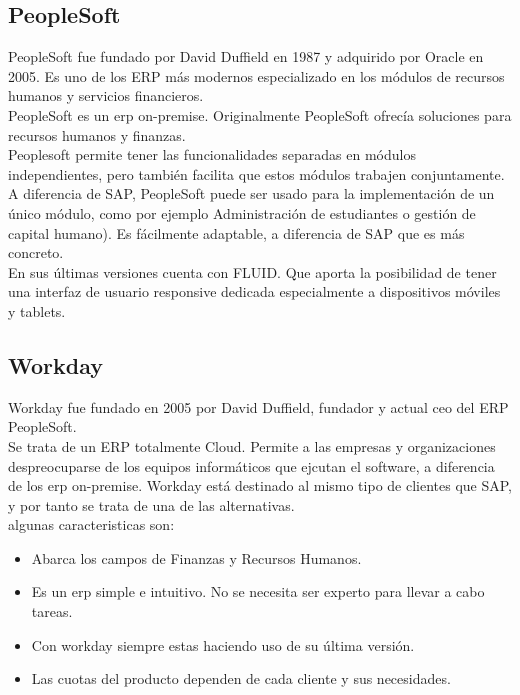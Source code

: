 \subsection{PeopleSoft}
PeopleSoft fue fundado por David Duffield en 1987 y adquirido por Oracle en 2005. Es uno de los ERP más modernos especializado en los módulos de recursos humanos y servicios financieros.\\

PeopleSoft es un \acrshort{erp} \gls{on-premise}.
Originalmente PeopleSoft ofrecía soluciones para recursos humanos y finanzas.\\

Peoplesoft permite tener las funcionalidades separadas en módulos independientes, pero también facilita que estos módulos trabajen conjuntamente.
A diferencia de SAP, PeopleSoft puede ser usado para la implementación de un único módulo, como por ejemplo Administración de estudiantes o gestión de capital humano).
Es fácilmente adaptable, a diferencia de SAP que es más concreto.\\

En sus últimas versiones cuenta con FLUID. Que aporta la posibilidad de tener una interfaz de usuario responsive dedicada especialmente a dispositivos móviles y tablets.



\subsection{Workday}
Workday fue fundado en 2005 por David Duffield, fundador y actual \acrshort{ceo} del ERP PeopleSoft.\\



Se trata de un ERP totalmente Cloud. Permite a las empresas y organizaciones despreocuparse de los equipos informáticos que ejcutan el software, a diferencia de los \acrshort{erp} \gls{on-premise}.
Workday está destinado al mismo tipo de clientes que SAP, y por tanto se trata de una de las alternativas.\\

algunas caracteristicas son:
\begin{itemize}
	\item Abarca los campos de Finanzas y Recursos Humanos.
	\item Es un \acrshort{erp} simple e intuitivo. No se necesita ser experto para llevar a cabo tareas.
	\item Con workday siempre estas haciendo uso de su última versión.
	\item Las cuotas del producto dependen de cada cliente y sus necesidades.
\end{itemize}


